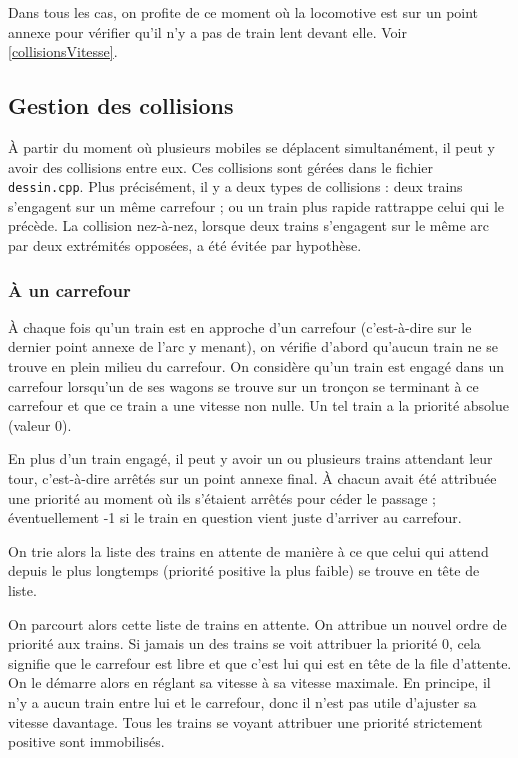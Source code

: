 \documentclass[a4paper, oneside, 11pt, twocolumn]{article}
\begin{document}
\bigskip

Dans tous les cas, on profite de ce moment où la locomotive est sur un point annexe pour vérifier qu'il n'y a pas de train lent devant elle. Voir \ref{collisionsVitesse}.

\subsection[Collisions]{Gestion des collisions}

À partir du moment où plusieurs mobiles se déplacent simultanément, il peut y avoir des collisions entre eux. Ces collisions sont gérées dans le fichier \texttt{dessin.cpp}. Plus précisément, il y a deux types de collisions : deux trains s'engagent sur un même carrefour ; ou un train plus rapide rattrappe celui qui le précède. La collision nez-à-nez, lorsque deux trains s'engagent sur le même arc par deux extrémités opposées, a été évitée par hypothèse.

\subsubsection{À un carrefour}
\label{collisionsCarrefour}

À chaque fois qu'un train est en approche d'un carrefour (c'est-à-dire sur le dernier point annexe de l'arc y menant), on vérifie d'abord qu'aucun train ne se trouve en plein milieu du carrefour. On considère qu'un train est engagé dans un carrefour lorsqu'un de ses wagons se trouve sur un tronçon se terminant à ce carrefour et que ce train a une vitesse non nulle. Un tel train a la priorité absolue (valeur 0).

En plus d'un train engagé, il peut y avoir un ou plusieurs trains attendant leur tour, c'est-à-dire arrêtés sur un point annexe final. À chacun avait été attribuée une priorité au moment où ils s'étaient arrêtés pour céder le passage ; éventuellement -1 si le train en question vient juste d'arriver au carrefour.

On trie alors la liste des trains en attente de manière à ce que celui qui attend depuis le plus longtemps (priorité positive la plus faible) se trouve en tête de liste.

On parcourt alors cette liste de trains en attente. On attribue un nouvel ordre de priorité aux trains. Si jamais un des trains se voit attribuer la priorité 0, cela signifie que le carrefour est libre et que c'est lui qui est en tête de la file d'attente. On le démarre alors en réglant sa vitesse à sa vitesse maximale. En principe, il n'y a aucun train entre lui et le carrefour, donc il n'est pas utile d'ajuster sa vitesse davantage. Tous les trains se voyant attribuer une priorité strictement positive sont immobilisés.
\end{document}

